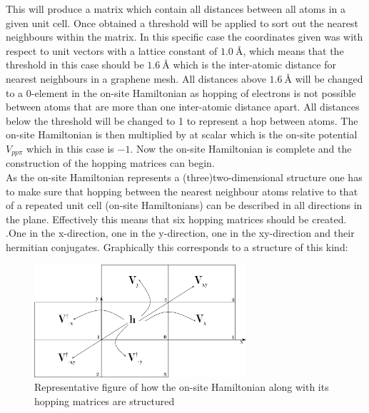 This will produce a matrix which contain all distances between all atoms in a given unit cell.  Once obtained a threshold will be applied to sort out the nearest neighbours within the matrix. In this specific case the coordinates given was with respect to unit vectors with a lattice constant of \(\SI{1.0}{\angstrom}\), which means that the threshold in this case should be \(\SI{1.6}{\angstrom}\) which is the inter-atomic distance for nearest neighbours in a graphene mesh. All distances above \(\SI{1.6}{\angstrom}\) will be changed to a 0-element in the on-site Hamiltonian as hopping of electrons is not possible between atoms that are more than one inter-atomic distance apart. All distances below the threshold will be changed to 1 to represent a hop between atoms. The on-site Hamiltonian is then multiplied by at scalar which is the on-site potential \(V_{pp\pi}\) which in this case is \(-1\). Now the on-site Hamiltonian is complete and the construction of the hopping matrices can begin. \\
As the on-site Hamiltonian represents a (three)two-dimensional structure one has to make sure that hopping between the nearest neighbour atoms relative to that of a repeated unit cell (on-site Hamiltonians) can be described in all directions in the plane. Effectively this means that six hopping matrices should be created. .One in the x-direction, one in the y-direction, one in the xy-direction and their hermitian conjugates. Graphically this corresponds to a structure of this kind:
\begin{figure}[H]
	\centering
	\includegraphics[width = 0.7\textwidth]{Figures/repfig.eps}
	\caption{Representative figure of how the on-site Hamiltonian along with its hopping matrices are structured}
	\label{repfig}
\end{figure}
